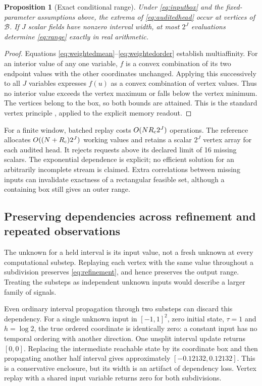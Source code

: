 \documentclass[11pt,a4paper]{article}
\newtheorem{proposition}[theorem]{Proposition}
\theoremstyle{definition}\newtheorem{definition}[theorem]{Definition}
\begin{document}
\begin{proposition}[Exact conditional range]\label{prop:vertex}
Under \eqref{eq:inputbox} and the fixed-parameter assumptions above, the extrema of \eqref{eq:auditedhead} occur at vertices of $\mathcal B$. If $J$ scalar fields have nonzero interval width, at most $2^J$ evaluations determine \eqref{eq:range} exactly in real arithmetic.
\end{proposition}
\begin{proof}
Equations \eqref{eq:weightedmean}--\eqref{eq:weightedorder} establish multiaffinity. For an interior value of any one variable, $f$ is a convex combination of its two endpoint values with the other coordinates unchanged. Applying this successively to all $J$ variables expresses $f(u)$ as a convex combination of vertex values. Thus no interior value exceeds the vertex maximum or falls below the vertex minimum. The vertices belong to the box, so both bounds are attained. This is the standard vertex principle \cite{blanchini2022}, applied to the explicit memory readout.
\end{proof}

For a finite window, batched replay costs $O(NR_{\rm c}2^J)$ operations. The reference allocates $O((N+R_{\rm c})2^J)$ working values and retains a scalar $2^J$ vertex array for each audited head. It rejects requests above its declared limit of 16 missing scalars. The exponential dependence is explicit; no efficient solution for an arbitrarily incomplete stream is claimed. Extra correlations between missing inputs can invalidate exactness of a rectangular feasible set, although a containing box still gives an outer range.

\subsection{Preserving dependencies across refinement and repeated observations}
The unknown for a held interval is its input value, not a fresh unknown at every computational substep. Replaying each vertex with the same value throughout a subdivision preserves \eqref{eq:refinement}, and hence preserves the output range. Treating the substeps as independent unknown inputs would describe a larger family of signals.

Even ordinary interval propagation through two substeps can discard this dependency. For a single unknown input in $[-1,1]^2$, zero initial state, $\tau=1$ and $h=\log2$, the true ordered coordinate is identically zero: a constant input has no temporal ordering with another direction. One unsplit interval update returns $[0,0]$. Replacing the intermediate reachable state by its coordinate box and then propagating another half interval gives approximately $[-0.12132,0.12132]$. This is a conservative enclosure, but its width is an artifact of dependency loss. Vertex replay with a shared input variable returns zero for both subdivisions.
\end{document}
